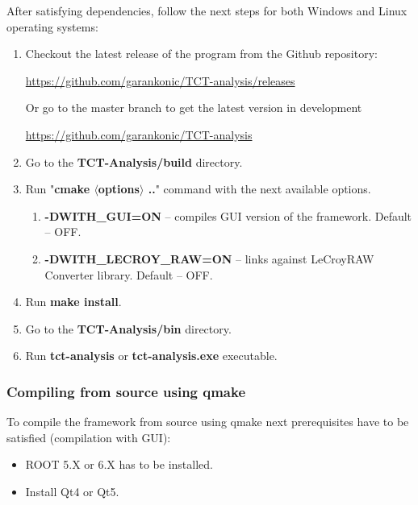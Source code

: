 \documentclass[12pt,oneside,notitlepage,abstracton,a4paper]{scrartcl}
\begin{document}
After satisfying dependencies, follow the next steps for both Windows and Linux operating systems:
\begin{enumerate}
\item Checkout the latest release of the program from the Github repository:
\begin{displayquote}
\url{https://github.com/garankonic/TCT-analysis/releases}
\end{displayquote}
Or go to the master branch to get the latest version in development
\begin{displayquote}
\url{https://github.com/garankonic/TCT-analysis}
\end{displayquote}
\item Go to the \textbf{TCT-Analysis/build} directory.
\item Run "\textbf{cmake $\langle$options$\rangle$ ..}" command with the next available options.
\begin{enumerate}
\item \textbf{-DWITH\_GUI=ON} -- compiles GUI version of the framework. Default -- OFF.
\item \textbf{-DWITH\_LECROY\_RAW=ON} -- links against LeCroyRAW Converter library. Default -- OFF.
\end{enumerate}
\item Run \textbf{make install}.
\item Go to the \textbf{TCT-Analysis/bin} directory.
\item Run \textbf{tct-analysis} or \textbf{tct-analysis.exe} executable.
\end{enumerate}

\subsubsection{Compiling from source using qmake}

To compile the framework from source using qmake next prerequisites have to be satisfied (compilation with GUI):
\begin{itemize}
\item ROOT 5.X or 6.X has to be installed.
\item Install Qt4 or Qt5.
\end{itemize}
\end{document}
